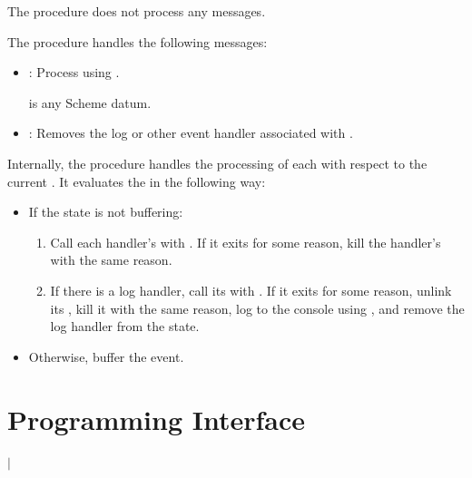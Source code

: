  The  procedure
does not process any messages.

The  procedure
handles the following messages:

\antipar\begin{itemize}

\item {}: Process  using
  .

   is any Scheme datum.

\item {}: Removes the log or other
  event handler associated with .

\end{itemize}

Internally, the  procedure
handles the processing of each  with respect to the current
. It evaluates the  in the following way:

\antipar
\begin{itemize}
  \item If the state is not buffering:
    \begin{enumerate}
    \item Call each handler's  with . If it exits
      for some reason, kill the handler's  with the same
      reason.

    \item If there is a log handler, call its  with
      . If it exits for some reason, unlink its
      , kill it with the same reason, log  to
      the console using , and remove the
      log handler from the state.
    \end{enumerate}

  \item Otherwise, buffer the event.
\end{itemize}

\section {Programming Interface}

\begin{procedure}
\end{procedure}
\returns{}
 $|$

